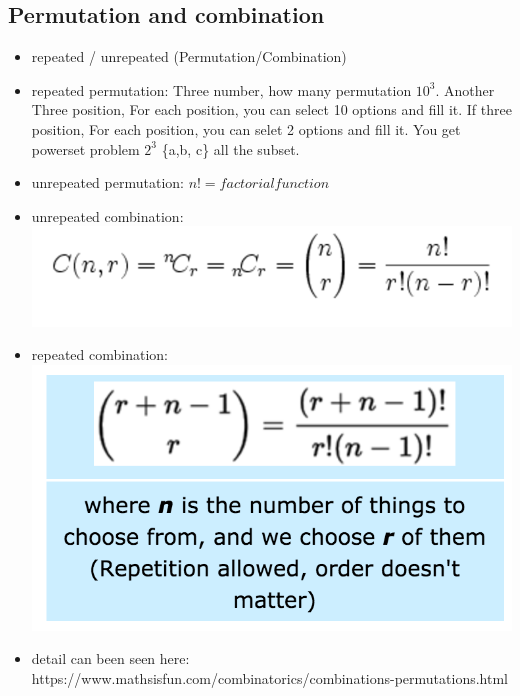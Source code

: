 \documentclass[a4paper,11pt,twoside]{book}
\begin{document}
\subsection{Permutation and combination}
\begin{itemize}
\item repeated / unrepeated (Permutation/Combination)

\item repeated permutation: Three number, how many permutation $10^3$. Another Three position, For each position, you can select 10 options and fill it.  If three position, For each position, you can selet 2 options and fill it. You get powerset problem $2^3$ \{a,b, c\} all the subset. 

\item unrepeated permutation: $n! = factorial function$
\item unrepeated combination:  
\includegraphics[scale=0.6]{pics/UC.png} \newline
\item repeated combination: 
\includegraphics[scale=0.6]{pics/RC.png} \newline
\item detail can been seen here: https://www.mathsisfun.com/combinatorics/combinations-permutations.html

\end{itemize}
\end{document}
